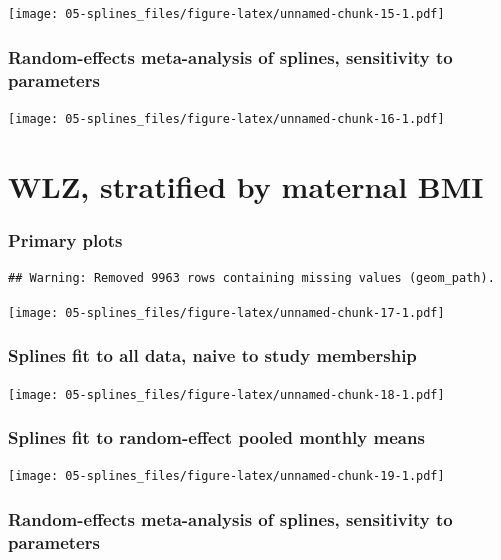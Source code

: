 \documentclass[9pt,]{book}
\begin{document}
\texttt{[image: 05-splines\_files/figure-latex/unnamed-chunk-15-1.pdf]}

\subsubsection{Random-effects meta-analysis of splines, sensitivity to
parameters}\label{random-effects-meta-analysis-of-splines-sensitivity-to-parameters-3}

\texttt{[image: 05-splines\_files/figure-latex/unnamed-chunk-16-1.pdf]}

\section{WLZ, stratified by maternal
BMI}\label{wlz-stratified-by-maternal-bmi}

\subsubsection{Primary plots}\label{primary-plots-4}

\begin{verbatim}
## Warning: Removed 9963 rows containing missing values (geom_path).
\end{verbatim}

\texttt{[image: 05-splines\_files/figure-latex/unnamed-chunk-17-1.pdf]}

\subsubsection{Splines fit to all data, naive to study
membership}\label{splines-fit-to-all-data-naive-to-study-membership-4}

\texttt{[image: 05-splines\_files/figure-latex/unnamed-chunk-18-1.pdf]}

\subsubsection{Splines fit to random-effect pooled monthly
means}\label{splines-fit-to-random-effect-pooled-monthly-means-4}

\texttt{[image: 05-splines\_files/figure-latex/unnamed-chunk-19-1.pdf]}

\subsubsection{Random-effects meta-analysis of splines, sensitivity to
parameters}\label{random-effects-meta-analysis-of-splines-sensitivity-to-parameters-4}
\end{document}
